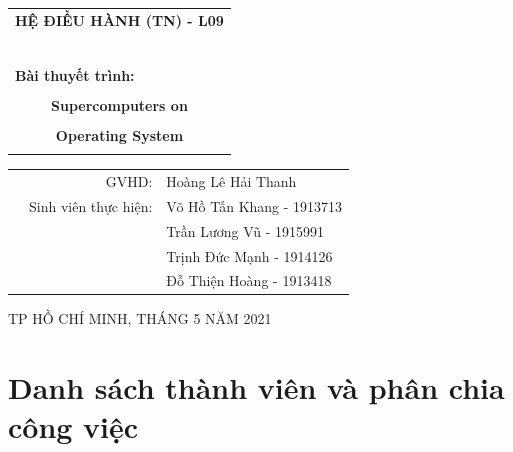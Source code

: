 \documentclass[a4paper]{article}
\begin{document}
\begin{titlepage}
		
		\begin{center}
			\begin{tabular}{c}
				\multicolumn{1}{c}{\textbf{\Large HỆ ĐIỀU HÀNH (TN) - L09}}\\
				~~\\
				\hline
				\\
				\multicolumn{1}{l}{\textbf{\Large Bài thuyết trình:}}\\
				\\
				\textbf{\huge Supercomputers on}\\
				\\
				\textbf{\huge Operating System}\\
				\\
				\hline
			\end{tabular}
		\end{center}
		\vspace{1cm}
		\begin{table}[h]
			\begin{tabular}{rrl}
				\hspace{4 cm} & GVHD: & Hoàng Lê Hải Thanh\\
				& Sinh viên thực hiện: & Võ Hồ Tấn Khang - 1913713 \\
				& & Trần Lương Vũ - 1915991  \\
				& & Trịnh Đức Mạnh - 1914126 \\
				& & Đỗ Thiện Hoàng - 1913418  \\
			\end{tabular}
		\end{table}
		\vspace{2cm}
		\begin{center}
			{\footnotesize  TP HỒ CHÍ MINH, THÁNG 5 NĂM 2021}
		\end{center}
	\end{titlepage}
	
	
	
	\newpage
	\tableofcontents
	\newpage
	
	
	
	\section{Danh sách thành viên và phân chia công việc}
	
\end{document}
